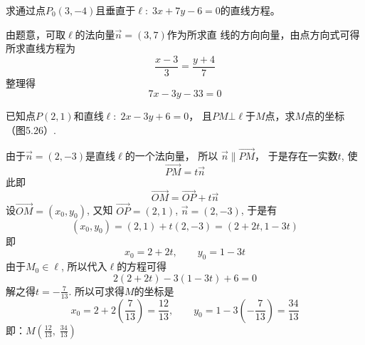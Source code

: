 \begin{example}
     求通过点$P_0(3,-4)$且垂直于$\ell:\; 3x+7y-6=0$的直线方程。
\end{example}

\begin{solution}
    由题意，可取$\ell$的法向量$\vec{n}=(3,7)$作为所求直
线的方向向量，由点方向式可得所求直线方程为
\[\frac{x-3}{3}=\frac{y+4}{7}\]
整理得
\[7x-3y-33=0\]
\end{solution}

\begin{example}
    已知点$P(2,1)$和直线$\ell:\; 2x-3y+6=0$，
且$PM\bot\ell $于$M$点，求$M$点的坐标（图5.26）.
\end{example}

\begin{figure}[htp]
    \centering
{}
    \caption{}
\end{figure}

\begin{solution}
    由于$\vec{n}=(2,-3)$是直线$\ell$的一个法向量，
所以
$\vec{n}\parallel \Vec{PM}$，
于是存在一实数$t$, 使
\[\Vec{PM}=t\vec{n}\]
此即
\[\Vec{OM}=\Vec{OP}+t\vec{n}\]
设$\Vec{OM}=(x_0,y_0)$, 又知
$\Vec{OP}=(2,1)$, $\vec{n}=(2,-3)$, 
于是有
\[(x_0,y_0)=(2,1)+t(2,-3)=(2+2t,1-3t)\]
即
\[x_0=2+2t,\qquad y_0=1-3t\]
由于$M_0\in\ell$, 所以代入$\ell$的方程可得
\[2(2+2t)-3(1-3t)+6=0\]
解之得$t=-\frac{7}{13}$. 所以可求得$M$的坐标是
\[x_0=2+2\left(\frac{7}{13}\right)=\frac{12}{13},\qquad y_0=1-3\left(-\frac{7}{13}\right)=\frac{34}{13}\]
即：$M\left(\frac{12}{13},\; \frac{34}{13}\right)$
\end{solution}

